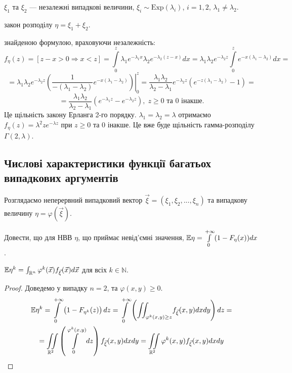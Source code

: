 \begin{example}
    $\xi_1$ та $\xi_2$ --- незалежні випадкові величини, $\xi_i \sim \mathrm{Exp}(\lambda_i)$, 
    $i = 1,2$, $\lambda_1 \neq \lambda_2$.

     закон розподілу $\eta = \xi_1 + \xi_2$.

     знайденою формулою, враховуючи незалежність:
    \begin{equation*}
        f_\eta(z) = \left[z - x > 0 \Rightarrow x < z\right] = 
        \int\limits_0^z \lambda_1 e^{-\lambda_1 x}\lambda_2e^{-\lambda_2(z-x)}dx
        =
        \lambda_1\lambda_2e^{-\lambda_2z}\int\limits_0^z e^{-x(\lambda_1 - \lambda_2)} dx=
    \end{equation*}
    \begin{equation*}
        =\lambda_1\lambda_2e^{-\lambda_2z}
        \left.
        \left(\frac{1}{-(\lambda_1 - \lambda_2)} e^{-x(\lambda_1 - \lambda_2)}\right)
        \right|_0^z = 
        \frac{\lambda_1\lambda_2}{\lambda_2 - \lambda_1}e^{-\lambda_2z}
        (e^{-z(\lambda_1 - \lambda_2)} - 1) =
    \end{equation*}
    \begin{equation*}
        = \frac{\lambda_1\lambda_2}{\lambda_2 - \lambda_1}(e^{-\lambda_1 z} - e^{-\lambda_2 z})
        ,\; z \geq 0 \text{ та } 0 \text{ інакше.}
    \end{equation*}
Це щільність закону Ерланга 2-го порядку.
 $\lambda_1 = \lambda_2 = \lambda$ отримаємо
$f_{\eta}(z) = \lambda^2 z e^{-\lambda z}$ при $z \geq 0$ та $0$ інакше.
Це вже буде щільність гамма-розподілу $\Gamma(2, \lambda)$.
\end{example}

\subsection{Числові характеристики функції багатьох випадкових аргументів}
Розглядаємо неперервний випадковий вектор $\vec{\xi} = (\xi_1, \xi_2, ..., \xi_n)$ та
випадкову величину $\eta = \varphi(\vec{\xi})$.
\begin{exercise}
    Довести, що для НВВ $\eta$, що приймає невід'ємні значення, $\mathbb{E}\eta = \int\limits_0^{+\infty} (1 - F_{\eta}(x)) dx$.
\end{exercise}

\begin{proposition*} 
    $\mathbb{E}\eta^k = \int_{\mathbb{R}^n} \varphi^k(\vec{x}) f_{\vec{\xi}} (\vec{x}) d\vec{x}$ для всіх $k \in \mathbb{N}$.
\end{proposition*}
\begin{proof}
    Доведемо у випадку $n=2$, та $\varphi(x, y) \geq 0$.
    \begin{gather*}
        \mathbb{E}\eta^k = \int\limits_0^{+\infty} \left(1 - F_{\eta^k}(z)\right) dz = 
    \int\limits_0^{+\infty} \left({\iint_{\varphi^k(x,y) \geq z}} f_{\vec{\xi}}(x,y) dx dy\right) dz = \\
    =\iint\limits_{\mathbb{R}^2} \left( \int\limits_0^{\varphi^k(x,y)} dz\right) f_{\vec{\xi}}(x,y) dx dy = 
     \iint\limits_{\mathbb{R}^2} \varphi^k(x,y) f_{\vec{\xi}}(x,y) dx dy
    \end{gather*}
\end{proof}

